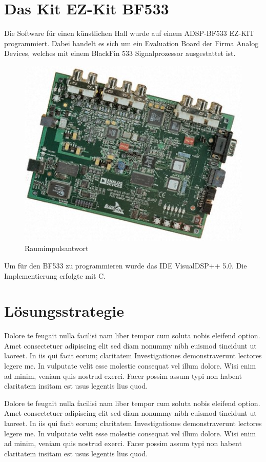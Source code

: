 \documentclass[a4paper,12pt,fontsize=12,DIV=12]{scrartcl}
\begin{document}
\section{Das Kit EZ-Kit BF533}
Die Software für einen künstlichen Hall wurde auf einem ADSP-BF533 EZ-KIT programmiert.
Dabei handelt es sich um ein Evaluation Board der Firma Analog Devices, welches mit einem BlackFin 533 Signalprozessor ausgestattet ist.
\begin{figure}[h]
	\includegraphics[scale=0.5]{Bilder/bf533.jpg}
	\caption{Raumimpulsantwort}
	\label{labelname}
\end{figure}
Um für den BF533 zu programmieren wurde das IDE VisualDSP++ 5.0.
Die Implementierung erfolgte mit C.


\section{Lösungsstrategie}
Dolore te feugait nulla facilisi nam liber tempor cum soluta nobis eleifend option. Amet consectetuer adipiscing elit sed diam nonummy nibh euismod tincidunt ut laoreet. In iis qui facit eorum; claritatem Investigationes demonstraverunt lectores legere me. In vulputate velit esse molestie consequat vel illum dolore. Wisi enim ad minim, veniam quis nostrud exerci. Facer possim assum typi non habent claritatem insitam est usus legentis lius quod.

Dolore te feugait nulla facilisi nam liber tempor cum soluta nobis eleifend option. Amet consectetuer adipiscing elit sed diam nonummy nibh euismod tincidunt ut laoreet. In iis qui facit eorum; claritatem Investigationes demonstraverunt lectores legere me. In vulputate velit esse molestie consequat vel illum dolore. Wisi enim ad minim, veniam quis nostrud exerci. Facer possim assum typi non habent claritatem insitam est usus legentis lius quod.
\end{document}
